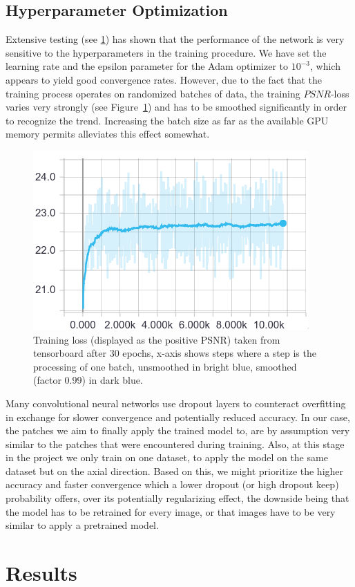 \documentclass[a4paper, 12pt]{article} %
\begin{document}
\subsection{Hyperparameter Optimization}
Extensive testing (see \ref{sec:results}) has shown that the performance of the network is very sensitive to the hyperparameters in the training procedure. We have set the learning rate and the epsilon parameter for the Adam optimizer to $10^{-3}$, which appears to yield good convergence rates. However, due to the fact that the training process operates on randomized batches of data, the training $PSNR$-loss varies very strongly (see Figure~\ref{fig:noisy-training}) and has to be smoothed significantly in order to recognize the trend. Increasing the batch size as far as the available GPU memory permits alleviates this effect somewhat.

\begin{figure}[h]
    \center%
    \includegraphics[width=0.4\columnwidth]{./figures/noisy-training.png}
    \caption{Training loss (displayed as the positive PSNR) taken from tensorboard after 30 epochs, x-axis shows steps where a step is the processing of one batch, unsmoothed in bright blue, smoothed (factor 0.99) in dark blue.}\label{fig:noisy-training}
\end{figure}


Many convolutional neural networks use dropout layers to counteract overfitting in exchange for slower convergence and potentially reduced accuracy. In our case, the patches we aim to finally apply the trained model to, are by assumption very similar to the patches that were encountered during training. Also, at this stage in the project we only train on one dataset, to apply the model on the same dataset but on the axial direction. Based on this, we might prioritize the higher accuracy and faster convergence which a lower dropout (or high dropout keep) probability offers, over its potentially regularizing effect, the downside being that the model has to be retrained for every image, or that images have to be very similar to apply a pretrained model.

\section{Results}\label{sec:results}
\end{document}
